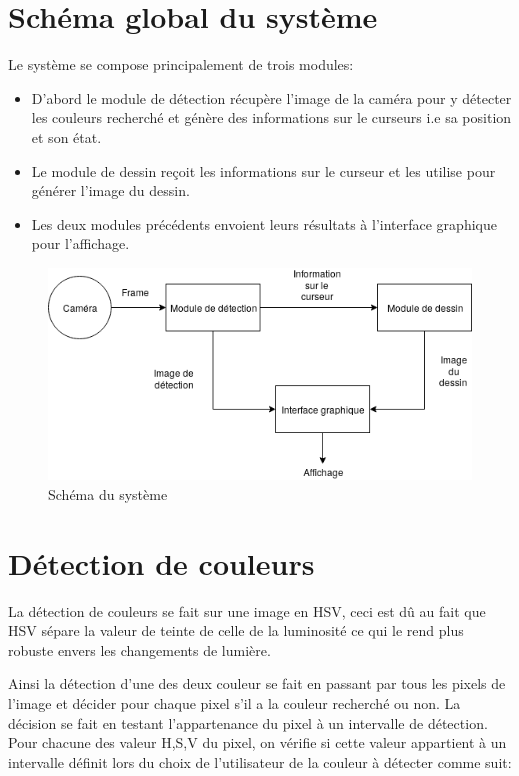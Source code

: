\documentclass[12pt]{report}
\begin{document}
\section{Schéma global du système}
Le système se compose principalement de trois modules:

\begin{itemize}
	\item D’abord le module de détection récupère l’image de la caméra pour y détecter les couleurs recherché et génère des informations sur le curseurs i.e sa position et son état.
	
	\item Le module de dessin reçoit les informations sur le curseur et les utilise pour générer l’image du dessin.
	
	\item Les deux modules précédents envoient leurs résultats à l’interface graphique pour l’affichage.
\end{itemize}

\begin{figure}[H]
	\centering
	\includegraphics[scale=0.75]{imgs/MainDiagram.png}
	\caption{Schéma du système}
	\label{fig:machineA}
\end{figure}

\section{Détection de couleurs}
La détection de couleurs se fait sur une image en HSV, ceci est dû au fait que HSV sépare la valeur de teinte de celle de la luminosité ce qui le rend plus robuste envers les changements de lumière. 

Ainsi la détection d’une des deux couleur se fait en passant par tous les pixels de l’image et décider pour chaque pixel s’il a la couleur recherché ou non. La décision se fait en testant l’appartenance du pixel à un intervalle de détection. Pour chacune des valeur H,S,V du pixel, on vérifie si cette valeur appartient à un intervalle définit lors du choix de l’utilisateur de la couleur à détecter comme suit: 
\end{document}
